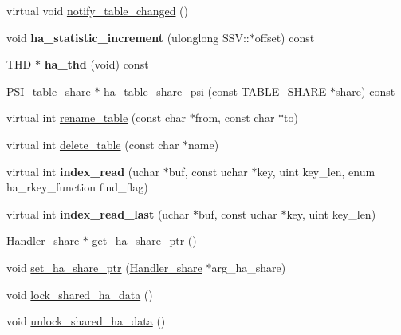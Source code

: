 \begin{DoxyCompactItemize}
\item 
virtual void \mbox{\hyperlink{classhandler_a26aaaf2105e60ca590b79fae82e48960}{notify\+\_\+table\+\_\+changed}} ()
\item 
\mbox{\label{classhandler_aad25b44b50ac64192d6cfef591252ed7}} 
void {\bfseries ha\+\_\+statistic\+\_\+increment} (ulonglong S\+S\+V\+::$\ast$offset) const
\item 
\mbox{\label{classhandler_a9df65ee64bcedb5a4b34bf752b2fab08}} 
T\+HD $\ast$ {\bfseries ha\+\_\+thd} (void) const
\item 
P\+S\+I\+\_\+table\+\_\+share $\ast$ \mbox{\hyperlink{classhandler_a69803cd29d92bfecd97212354212c516}{ha\+\_\+table\+\_\+share\+\_\+psi}} (const \mbox{\hyperlink{structTABLE__SHARE}{T\+A\+B\+L\+E\+\_\+\+S\+H\+A\+RE}} $\ast$share) const
\item 
virtual int \mbox{\hyperlink{classhandler_a58bf8fa32d87654794e6b1c3b3fb8d32}{rename\+\_\+table}} (const char $\ast$from, const char $\ast$to)
\item 
virtual int \mbox{\hyperlink{classhandler_ae53ec34116b901cc08e5a87f5ec681a6}{delete\+\_\+table}} (const char $\ast$name)
\item 
\mbox{\label{classhandler_a4ccf806316a9d88a7130d70e7637e8e5}} 
virtual int {\bfseries index\+\_\+read} (uchar $\ast$buf, const uchar $\ast$key, uint key\+\_\+len, enum ha\+\_\+rkey\+\_\+function find\+\_\+flag)
\item 
\mbox{\label{classhandler_a90af353b21f935dc95212e1cfef50452}} 
virtual int {\bfseries index\+\_\+read\+\_\+last} (uchar $\ast$buf, const uchar $\ast$key, uint key\+\_\+len)
\item 
\mbox{\hyperlink{classHandler__share}{Handler\+\_\+share}} $\ast$ \mbox{\hyperlink{classhandler_a13bf21a8ad4be872bbfe94f5cb40abca}{get\+\_\+ha\+\_\+share\+\_\+ptr}} ()
\item 
void \mbox{\hyperlink{classhandler_ab24470ac1d4ac336cedbe7c245d321c9}{set\+\_\+ha\+\_\+share\+\_\+ptr}} (\mbox{\hyperlink{classHandler__share}{Handler\+\_\+share}} $\ast$arg\+\_\+ha\+\_\+share)
\item 
void \mbox{\hyperlink{classhandler_aa3a39db9dc1cca31f4a3ec0e0e1d7300}{lock\+\_\+shared\+\_\+ha\+\_\+data}} ()
\item 
void \mbox{\hyperlink{classhandler_a8059bbed3de416b3bea51c69dc064e79}{unlock\+\_\+shared\+\_\+ha\+\_\+data}} ()
\end{DoxyCompactItemize}

